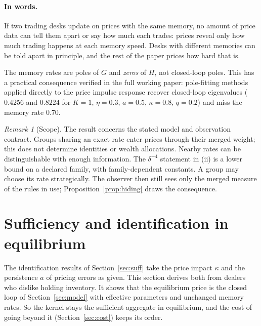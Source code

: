 \documentclass[12pt]{article}
\theoremstyle{definition}
\theoremstyle{remark}
\newtheorem{remark}[theorem]{Remark}
\begin{document}
\paragraph{In words.} If two trading desks update on prices with the same memory, no amount of price data can tell them apart or say how much each trades: prices reveal only how much trading happens at each memory speed. Desks with different memories can be told apart in principle, and the rest of the paper prices how hard that is.


The memory rates are poles of $G$ and \emph{zeros} of $H$, not closed-loop poles. This has a practical consequence verified in the full working paper: pole-fitting methods applied directly to the price impulse response recover closed-loop eigenvalues ($0.4256$ and $0.8224$ for $K=1$, $\eta=0.3$, $a=0.5$, $\kappa=0.8$, $q=0.2$) and miss the memory rate $0.70$.
\begin{remark}[Scope]\label{rem:scope}
The result concerns the stated model and observation contract. Groups sharing an exact rate enter prices through their merged weight; this does not determine identities or wealth allocations. Nearby rates can be distinguishable with enough information. The $\delta^{-4}$ statement in (ii) is a lower bound on a declared family, with family-dependent constants. A group may choose its rate strategically. The observer then still sees only the merged measure of the rules in use; Proposition~\ref{prop:hiding} draws the consequence.
\end{remark}
\section{Sufficiency and identification in equilibrium}\label{sec:equilibrium}

The identification results of Section~\ref{sec:suff} take the price impact $\kappa$ and the persistence $a$ of pricing errors as given. This section derives both from dealers who dislike holding inventory. It shows that the equilibrium price is the closed loop of Section~\ref{sec:model} with effective parameters and unchanged memory rates. So the kernel stays the sufficient aggregate in equilibrium, and the cost of going beyond it (Section~\ref{sec:cost}) keeps its order.
\end{document}
